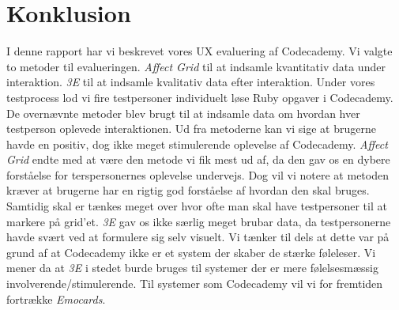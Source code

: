 \chapter{Konklusion}\label{ch:konk}
I denne rapport har vi beskrevet vores UX evaluering af Codecademy. Vi valgte to metoder til evalueringen. \textit{Affect Grid} til at indsamle kvantitativ data under interaktion. \textit{3E} til at indsamle kvalitativ data efter interaktion. Under vores testprocess lod vi fire testpersoner individuelt løse Ruby opgaver i Codecademy. De overnævnte metoder blev brugt til at indsamle data om hvordan hver testperson oplevede interaktionen. Ud fra metoderne kan vi sige at brugerne havde en positiv, dog ikke meget stimulerende oplevelse af Codecademy. \textit{Affect Grid} endte med at være den metode vi fik mest ud af, da den gav os en dybere forståelse for terspersonernes oplevelse undervejs. Dog vil vi notere at metoden kræver at brugerne har en rigtig god forståelse af hvordan den skal bruges. Samtidig skal er tænkes meget over hvor ofte man skal have testpersoner til at markere på grid'et. \textit{3E} gav os ikke særlig meget brubar data, da testpersonerne havde svært ved at formulere sig selv visuelt. Vi tænker til dels at dette var på grund af at Codecademy ikke er et system der skaber de stærke føleleser. Vi mener da at \textit{3E} i stedet burde bruges til systemer der er mere følelsesmæssig involverende/stimulerende. Til systemer som Codecademy vil vi for fremtiden fortrække \textit{Emocards}. 

